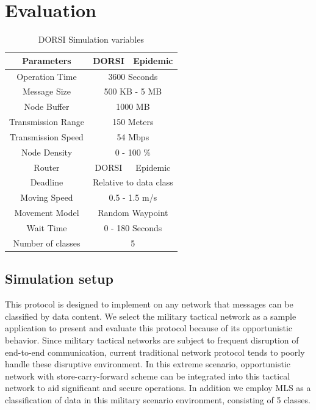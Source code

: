 \section{Evaluation}
\label{DORSI:Evaluation}
\begin{table}[!t]
		\renewcommand{\arraystretch}{1.3}
		\centering
		\begin{tabular}{|c|c|c|}
			\hline
			Parameters         & DORSI                  & Epidemic \\ \hline
			Operation Time     & \multicolumn{2}{|c|}{3600 Seconds }  \\ \hline
			Message Size       &           \multicolumn{2}{|c|}{500 KB - 5 MB}        \\ \hline
			Node Buffer        &              \multicolumn{2}{|c|}{1000 MB   }       \\ \hline
			Transmission Range &              \multicolumn{2}{|c|}{150 Meters  }        \\ \hline
			Transmission Speed &              \multicolumn{2}{|c|}{ 54 Mbps   }        \\ \hline
			Node Density       &                \multicolumn{2}{|c|}{0 - 100 \% }        \\ \hline
			Router             & DORSI                  & Epidemic \\ \hline
			Deadline                &  \multicolumn{2}{|c|}{Relative to data class}       \\ \hline
			Moving Speed       &          \multicolumn{2}{|c|}{0.5 - 1.5 m/s }        \\ \hline
			Movement Model     &       \multicolumn{2}{|c|}{Random Waypoint  }      \\ \hline
			Wait Time     &       \multicolumn{2}{|c|}{0 - 180 Seconds  }      \\ \hline
			Number of classes     &       \multicolumn{2}{|c|}{5 }      \\ \hline
		\end{tabular}
		\caption{DORSI Simulation variables}
		\label{TB:DORSI:table_parameters}
	\end{table}

\subsection{Simulation setup}
This protocol is designed to implement on any network that messages can be classified by data content. 
We select the military tactical network as a sample application to present and evaluate this protocol because of its opportunistic behavior. 
Since military tactical networks are subject to frequent disruption of end-to-end communication, current traditional network protocol tends to poorly handle these disruptive environment. 
In this extreme scenario, opportunistic network with store-carry-forward scheme can be integrated into this tactical network to aid significant and secure operations. 
In addition we employ MLS \cite{Winjum2008} as a classification of data in this military scenario environment, consisting of 5 classes.

